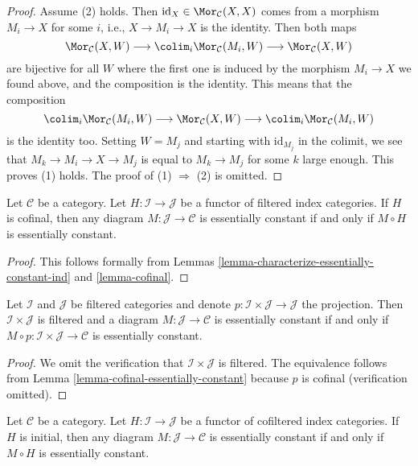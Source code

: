 \begin{proof}
Assume (2) holds. Then $\text{id}_X \in \Mor_\mathcal{C}(X, X)$
comes from a morphism $M_i \to X$ for some $i$, i.e., $X \to M_i \to X$
is the identity. Then both maps
$$
\Mor_\mathcal{C}(X, W)
\longrightarrow
\colim_i \Mor_\mathcal{C}(M_i, W)
\longrightarrow
\Mor_\mathcal{C}(X, W)
$$
are bijective for all $W$ where the first one is induced by the morphism
$M_i \to X$ we found above, and the composition is the identity. This means
that the composition
$$
\colim_i \Mor_\mathcal{C}(M_i, W)
\longrightarrow
\Mor_\mathcal{C}(X, W)
\longrightarrow
\colim_i \Mor_\mathcal{C}(M_i, W)
$$
is the identity too. Setting $W = M_j$ and starting with $\text{id}_{M_j}$
in the colimit, we see that $M_k \to M_i \to X \to M_j$ is equal to
$M_k \to M_j$ for some $k$ large enough. This proves (1) holds.
The proof of (1) $\Rightarrow$ (2) is omitted.
\end{proof}

\begin{lemma}
\label{lemma-cofinal-essentially-constant}
Let $\mathcal{C}$ be a category. Let $H : \mathcal{I} \to \mathcal{J}$
be a functor of filtered index categories. If $H$ is cofinal, then
any diagram $M : \mathcal{J} \to \mathcal{C}$ is essentially constant
if and only if $M \circ H$ is essentially constant.
\end{lemma}

\begin{proof}
This follows formally from
Lemmas \ref{lemma-characterize-essentially-constant-ind} and
\ref{lemma-cofinal}.
\end{proof}

\begin{lemma}
\label{lemma-essentially-constant-over-product}
Let $\mathcal{I}$ and $\mathcal{J}$ be filtered categories and denote
$p : \mathcal{I} \times \mathcal{J} \to \mathcal{J}$ the projection.
Then $\mathcal{I} \times \mathcal{J}$ is filtered and a diagram
$M : \mathcal{J} \to \mathcal{C}$ is essentially constant if and only
if $M \circ p : \mathcal{I} \times \mathcal{J} \to \mathcal{C}$
is essentially constant.
\end{lemma}

\begin{proof}
We omit the verification that $\mathcal{I} \times \mathcal{J}$ is
filtered. The equivalence follows from
Lemma \ref{lemma-cofinal-essentially-constant}
because $p$ is cofinal (verification omitted).
\end{proof}

\begin{lemma}
\label{lemma-initial-essentially-constant}
Let $\mathcal{C}$ be a category. Let $H : \mathcal{I} \to \mathcal{J}$
be a functor of cofiltered index categories. If $H$ is initial, then
any diagram $M : \mathcal{J} \to \mathcal{C}$ is essentially constant
if and only if $M \circ H$ is essentially constant.
\end{lemma}

